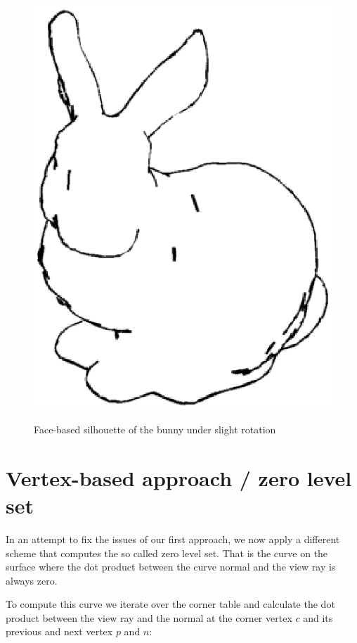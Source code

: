 \documentclass[a4paper,10pt,notitlepage]{scrreprt}
\begin{document}
\begin{figure}
{    \includegraphics[scale=0.4]{img-2-2/bunny-2.eps}}
 \caption{Face-based silhouette of the bunny under slight rotation}
 \label{fig:face-silhouette-bunny}
\end{figure}

\section{Vertex-based approach / zero level set}

In an attempt to fix the issues of our first approach, we now apply a different
scheme that computes the so called zero level set. That is the curve on the
surface where the dot product between the curve normal and the view ray is
always zero.

To compute this curve we iterate over the corner table and calculate the dot
product between the view ray and the normal at the corner vertex $c$ and its
previous and next vertex $p$ and $n$:
\end{document}
